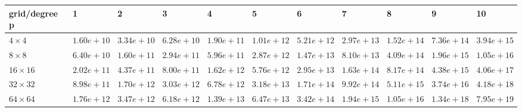 \begin{tabular}{lllllllllll}
\hline
 grid/degree p   & 1          & 2          & 3          & 4          & 5          & 6          & 7          & 8          & 9          & 10         \\
\hline
 $4 \times 4$    & $1.60e+10$ & $3.34e+10$ & $6.28e+10$ & $1.90e+11$ & $1.01e+12$ & $5.21e+12$ & $2.97e+13$ & $1.52e+14$ & $7.36e+14$ & $3.94e+15$ \\
 $8 \times 8$    & $6.40e+10$ & $1.60e+11$ & $2.94e+11$ & $5.96e+11$ & $2.87e+12$ & $1.47e+13$ & $8.10e+13$ & $4.09e+14$ & $1.96e+15$ & $1.05e+16$ \\
 $16 \times 16$  & $2.02e+11$ & $4.37e+11$ & $8.00e+11$ & $1.62e+12$ & $5.76e+12$ & $2.95e+13$ & $1.63e+14$ & $8.17e+14$ & $4.38e+15$ & $4.06e+17$ \\
 $32 \times 32$  & $8.98e+11$ & $1.70e+12$ & $3.03e+12$ & $6.78e+12$ & $3.18e+13$ & $1.71e+14$ & $9.92e+14$ & $5.11e+15$ & $3.74e+16$ & $4.18e+18$ \\
 $64 \times 64$  & $1.76e+12$ & $3.47e+12$ & $6.18e+12$ & $1.39e+13$ & $6.47e+13$ & $3.42e+14$ & $1.94e+15$ & $1.05e+16$ & $1.34e+18$ & $7.95e+19$ \\
\hline
\end{tabular}